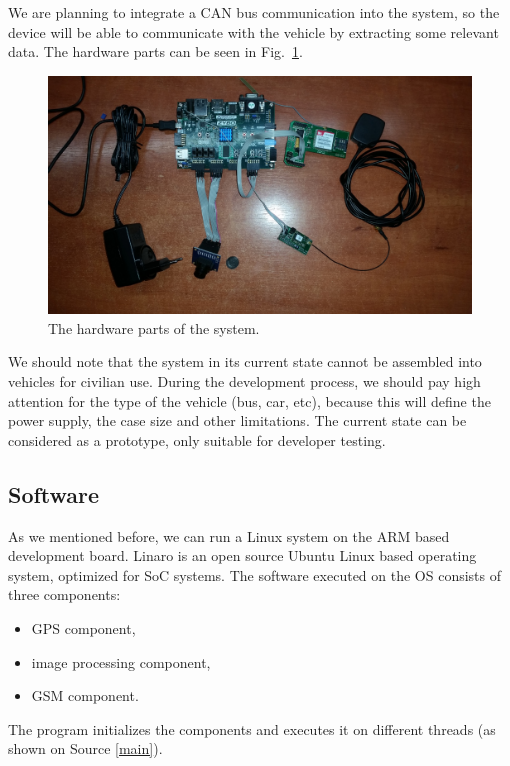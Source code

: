 \documentclass[b5paper,12pt]{report}
\theoremstyle{definition}
\begin{document}
We are planning to integrate a CAN bus communication into the system, so the device will be able to communicate with the vehicle by extracting some relevant data. The hardware parts can be seen in Fig.~\ref{currentsys}.

\begin{figure}[ht]
\centerline{
\includegraphics[width=12cm]{img/currentsys.jpg}}
\caption{The hardware parts of the system.}
\label{currentsys}
\end{figure}

We should note that the system in its current state cannot be assembled into vehicles for civilian use. During the development process, we should pay high attention for the type of the vehicle (bus, car, etc), because this will define the power supply, the case size and other limitations. The current state can be considered as a prototype, only suitable for developer testing.

\subsection{Software}
\label{rttasw}

As we mentioned before, we can run a Linux system on the ARM based development board. Linaro is an open source Ubuntu Linux based operating system, optimized for SoC systems. The software executed on the OS consists of three components:

\begin{itemize}
\item GPS component,
\item image processing component,
\item GSM component.
\end{itemize}

The program initializes the components and executes it on different threads (as shown on Source \ref{main}).
\end{document}
